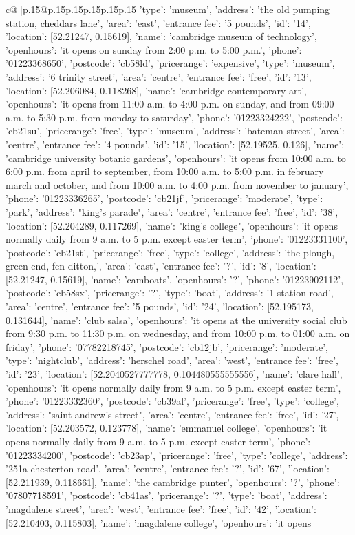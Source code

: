\documentclass{article}
\begin{document}
{\begin{supertabular}{c@{$\;$}|p{.15\linewidth}@{}p{.15\linewidth}p{.15\linewidth}p{.15\linewidth}p{.15\linewidth}p{.15\linewidth}}
{{{'type': 'museum'}, {'address': 'the old pumping station, cheddars lane', 'area': 'east', 'entrance fee': '5 pounds', 'id': '14', 'location': [52.21247, 0.15619], 'name': 'cambridge museum of technology', 'openhours': 'it opens on sunday from 2:00 p.m. to 5:00 p.m.', 'phone': '01223368650', 'postcode': 'cb58ld', 'pricerange': 'expensive', 'type': 'museum'}, {'address': '6 trinity street', 'area': 'centre', 'entrance fee': 'free', 'id': '13', 'location': [52.206084, 0.118268], 'name': 'cambridge contemporary art', 'openhours': 'it opens from 11:00 a.m. to 4:00 p.m. on sunday, and from 09:00 a.m. to 5:30 p.m. from monday to saturday', 'phone': '01223324222', 'postcode': 'cb21su', 'pricerange': 'free', 'type': 'museum'}, {'address': 'bateman street', 'area': 'centre', 'entrance fee': '4 pounds', 'id': '15', 'location': [52.19525, 0.126], 'name': 'cambridge university botanic gardens', 'openhours': 'it opens from 10:00 a.m. to 6:00 p.m. from april to september, from 10:00 a.m. to 5:00 p.m. in february march and october, and from 10:00 a.m. to 4:00 p.m. from november to january', 'phone': '01223336265', 'postcode': 'cb21jf', 'pricerange': 'moderate', 'type': 'park'}, {'address': "king's parade", 'area': 'centre', 'entrance fee': 'free', 'id': '38', 'location': [52.204289, 0.117269], 'name': "king's college", 'openhours': 'it opens normally daily from 9 a.m. to 5 p.m. except easter term', 'phone': '01223331100', 'postcode': 'cb21st', 'pricerange': 'free', 'type': 'college'}, {'address': 'the plough, green end, fen ditton,', 'area': 'east', 'entrance fee': '?', 'id': '8', 'location': [52.21247, 0.15619], 'name': 'camboats', 'openhours': '?', 'phone': '01223902112', 'postcode': 'cb58sx', 'pricerange': '?', 'type': 'boat'}, {'address': '1 station road', 'area': 'centre', 'entrance fee': '5 pounds', 'id': '24', 'location': [52.195173, 0.131644], 'name': 'club salsa', 'openhours': 'it opens at the university social club from 9:30 p.m. to 11:30 p.m. on wednesday, and from 10:00 p.m. to 01:00 a.m. on friday', 'phone': '07782218745', 'postcode': 'cb12jb', 'pricerange': 'moderate', 'type': 'nightclub'}, {'address': 'herschel road', 'area': 'west', 'entrance fee': 'free', 'id': '23', 'location': [52.2040527777778, 0.104480555555556], 'name': 'clare hall', 'openhours': 'it opens normally daily from 9 a.m. to 5 p.m. except easter term', 'phone': '01223332360', 'postcode': 'cb39al', 'pricerange': 'free', 'type': 'college'}, {'address': "saint andrew's street", 'area': 'centre', 'entrance fee': 'free', 'id': '27', 'location': [52.203572, 0.123778], 'name': 'emmanuel college', 'openhours': 'it opens normally daily from 9 a.m. to 5 p.m. except easter term', 'phone': '01223334200', 'postcode': 'cb23ap', 'pricerange': 'free', 'type': 'college'}, {'address': '251a chesterton road', 'area': 'centre', 'entrance fee': '?', 'id': '67', 'location': [52.211939, 0.118661], 'name': 'the cambridge punter', 'openhours': '?', 'phone': '07807718591', 'postcode': 'cb41as', 'pricerange': '?', 'type': 'boat'}, {'address': 'magdalene street', 'area': 'west', 'entrance fee': 'free', 'id': '42', 'location': [52.210403, 0.115803], 'name': 'magdalene college', 'openhours': 'it opens }}}
\end{supertabular}}
\end{document}
